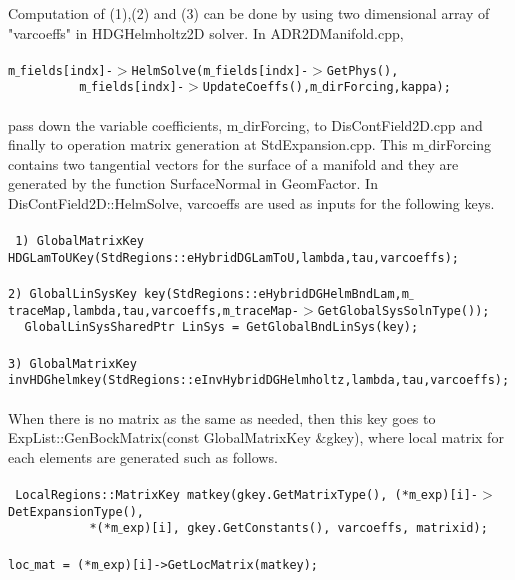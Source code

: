 \documentclass{elsart}
\begin{document}
Computation of (1),(2) and (3) can be done by using two dimensional array of "varcoeffs" in HDGHelmholtz2D solver. In ADR2DManifold.cpp, \\
\\
\texttt{m$\_$fields[indx]-$>$HelmSolve(m$\_$fields[indx]-$>$GetPhys(),\\
$~~~~~~~~~~~~~~~~~~~~~~~$m$\_$fields[indx]-$>$UpdateCoeffs(),m$\_$dirForcing,kappa);}
 \\
 \\
pass down the variable coefficients, m$\_$dirForcing, to DisContField2D.cpp and finally to operation matrix generation at StdExpansion.cpp. This m$\_$dirForcing contains two tangential vectors for the surface of a manifold and they are generated by the function SurfaceNormal in GeomFactor. In DisContField2D::HelmSolve, varcoeffs are used as inputs for the following keys.\\
\\
\texttt{           1) GlobalMatrixKey HDGLamToUKey(StdRegions::eHybridDGLamToU,lambda,tau,varcoeffs); \\
            \\
             2) GlobalLinSysKey       key(StdRegions::eHybridDGHelmBndLam,m$\_$traceMap,lambda,tau,varcoeffs,m$\_$traceMap-$>$GetGlobalSysSolnType());\\
                            $~~~$ GlobalLinSysSharedPtr LinSys = GetGlobalBndLinSys(key); \\
                             \\
             3) GlobalMatrixKey invHDGhelmkey(StdRegions::eInvHybridDGHelmholtz,lambda,tau,varcoeffs);}
\\
\\
When there is no matrix as the same as needed, then this key goes to ExpList::GenBockMatrix(const GlobalMatrixKey $\&$gkey), where local matrix
for each elements are generated such as follows.\\
\\
\texttt{                LocalRegions::MatrixKey matkey(gkey.GetMatrixType(),
                                               (*m$\_$exp)[i]-$>$DetExpansionType(), \\
                                         $ ~~~~~~~~~~~~~~~~~~~~~~~~$     *(*m$\_$exp)[i],
                                               gkey.GetConstants(),
                                               varcoeffs,
                                               matrixid); \\
\\
                loc$\_$mat = (*m$\_$exp)[i]->GetLocMatrix(matkey);}
\end{document}
